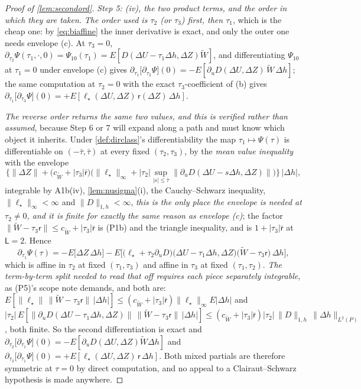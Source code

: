 \begin{proof}[Proof of \cref{lem:secondord}]
\emph{Step 5: (iv), the two product terms, and the order in which they are taken.}
\emph{The order used is $\tau_2$ (or $\tau_3$) first, then $\tau_1$}, which is the cheap one: by
\eqref{eq:biaffine} the inner derivative is exact, and only the outer one needs envelope (c). At
$\tau_3=0$,
$\partial_{\tau_2}\Psi(\tau_1,\cdot,0)=\Psi_{10}(\tau_1)=E[D(\Delta U-\tau_1\Delta h,\Delta Z)\widetilde W]$,
and differentiating $\Psi_{10}$ at $\tau_1=0$ under envelope (c) gives
$\partial_{\tau_1}\big[\partial_{\tau_2}\Psi\big](0)=-E[\partial_uD(\Delta U,\Delta Z)\,\widetilde W\,\Delta h]$;
the same computation at $\tau_2=0$ with the exact $\tau_3$-coefficient of (b) gives
$\partial_{\tau_1}\big[\partial_{\tau_3}\Psi\big](0)=+E[\ell_\star(\Delta U,\Delta Z)\,\mathsf r(\Delta Z)\,\Delta h]$.

\emph{The reverse order returns the same two values, and this is verified rather than assumed}, because
Step 6 or 7 will expand along a path and must know which object it inherits. Under
\cref{def:dirclass}'s differentiability the map $\tau_1\mapsto\Psi(\tau)$ is differentiable on
$(-\bar\tau,\bar\tau)$ at every fixed $(\tau_2,\tau_3)$, by the \emph{mean value inequality} with the envelope
\[
\Big\{\|\Delta Z\|+\big(c_{\widetilde W}+|\tau_3|\bar{\mathsf r}\big)\Big(\|\ell_\star\|_\infty
+|\tau_2|\sup_{|s|\le\bar\tau}\big\|\partial_uD(\Delta U-s\Delta h,\Delta Z)\big\|\Big)\Big\}\,\big|\Delta h\big| ,
\]
integrable by A1b(iv), \cref{lem:nusigma}(i), the Cauchy--Schwarz inequality, $\|\ell_\star\|_\infty<\infty$
and $\|D\|_{1,h}<\infty$, \emph{this is the only place the envelope is needed at $\tau_2\ne0$, and it
is finite for exactly the same reason as envelope (c)}; the factor
$\|\widetilde W-\tau_3\mathsf r\|\le c_{\widetilde W}+|\tau_3|\bar{\mathsf r}$ is \textup{(P1b)} and the
triangle inequality, and is $1+|\tau_3|\bar{\mathsf r}$ at $\mathsf L=2$. Hence
\[
\partial_{\tau_1}\Psi(\tau)=-E\big[\Delta Z\,\Delta h\big]
-E\Big[\big(\ell_\star+\tau_2\partial_uD\big)\big(\Delta U-\tau_1\Delta h,\Delta Z\big)\big(\widetilde W-\tau_3\mathsf r\big)\,\Delta h\Big],
\]
which is affine in $\tau_2$ at fixed $(\tau_1,\tau_3)$ and affine in $\tau_3$ at fixed $(\tau_1,\tau_2)$.
\emph{The term-by-term split needed to read that off requires each piece separately integrable}, as (P5)'s
scope note demands, and both are:
$E[\|\ell_\star\|\,\|\widetilde W-\tau_3\mathsf r\|\,|\Delta h|]
\le(c_{\widetilde W}+|\tau_3|\bar{\mathsf r})\|\ell_\star\|_\infty E|\Delta h|$ and
$|\tau_2|\,E[\|\partial_uD(\Delta U-\tau_1\Delta h,\Delta Z)\|\,\|\widetilde W-\tau_3\mathsf r\|\,|\Delta h|]
\le(c_{\widetilde W}+|\tau_3|\bar{\mathsf r})|\tau_2|\,\|D\|_{1,h}\,\|\Delta h\|_{L^{2}(P)}$, both finite.
So the second
differentiation is exact and
$\partial_{\tau_2}\big[\partial_{\tau_1}\Psi\big](0)=-E[\partial_uD(\Delta U,\Delta Z)\widetilde W\Delta h]$
and $\partial_{\tau_3}\big[\partial_{\tau_1}\Psi\big](0)=+E[\ell_\star(\Delta U,\Delta Z)\,\mathsf r\,\Delta h]$.
Both mixed partials are therefore symmetric at $\tau=0$ by direct computation, and no appeal to a
Clairaut--Schwarz hypothesis is made anywhere.


\end{proof}
